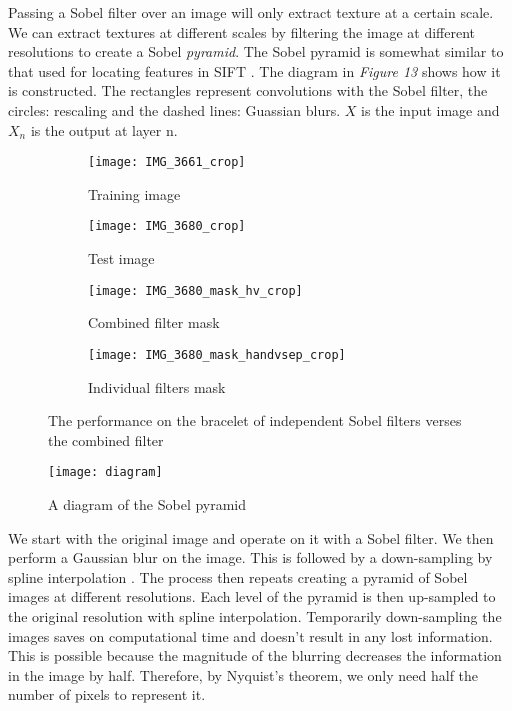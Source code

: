 \documentclass[12pt]{IIBproject}
\begin{document}
Passing a Sobel filter over an image will only extract texture at a certain scale. We can extract textures at different scales by filtering the image at different resolutions to create a Sobel \emph{pyramid}. The Sobel pyramid is somewhat similar to that used for locating features in SIFT \cite{lowe1999object}. The diagram in \emph{Figure 13} shows how it is constructed. The rectangles represent convolutions with the Sobel filter, the circles: rescaling and the dashed lines: Guassian blurs. $X$ is the input image and $X_n$ is the output at layer n.
\begin{figure}[H]
\centering
\begin{subfigure}{.45\textwidth}
  \centering
  \texttt{[image: IMG\_3661\_crop]}
  \caption{Training image}
  \label{fig:sub2}
\end{subfigure}
\begin{subfigure}{.45\textwidth}
  \centering
  \texttt{[image: IMG\_3680\_crop]}
  \caption{Test image}
  \label{fig:sub2}
\end{subfigure}
\begin{subfigure}{.45\textwidth}
  \centering
  \texttt{[image: IMG\_3680\_mask\_hv\_crop]}
  \caption{Combined filter mask}
  \label{fig:sub1}
\end{subfigure}%
\begin{subfigure}{.45\textwidth}
  \centering
  \texttt{[image: IMG\_3680\_mask\_handvsep\_crop]}
  \caption{Individual filters mask}
  \label{fig:sub2}
\end{subfigure}

\caption{The performance on the bracelet of independent Sobel filters verses the combined filter}
\label{fig:test}
\end{figure}
\begin{figure}[H]
  
  \centering
    \texttt{[image: diagram]}
    \caption{A diagram of the Sobel pyramid}
\end{figure}
 We start with the original image and operate on it with a Sobel filter. We then perform a Gaussian blur on the image. This is followed by a down-sampling by spline interpolation \cite{rescale}. The process then repeats creating a pyramid of Sobel images at different resolutions. Each level of the pyramid is then up-sampled to the original resolution with spline interpolation. Temporarily down-sampling the images saves on computational time and doesn't result in any lost information. This is possible because the magnitude of the blurring decreases the information in the image by half. Therefore, by Nyquist's theorem, we only need half the number of pixels to represent it.
\end{document}
